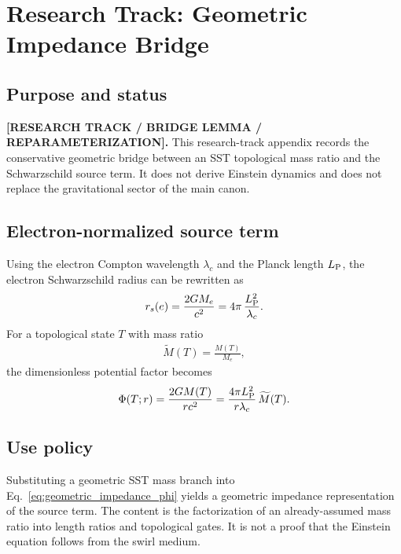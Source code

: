 
\section{Research Track: Geometric Impedance Bridge}
\label{sec:rt_geometric_impedance_bridge}

    \subsection{Purpose and status}
        \textbf{[RESEARCH TRACK / BRIDGE LEMMA / REPARAMETERIZATION].}
        This research-track appendix records the conservative geometric bridge
        between an SST topological mass ratio and the Schwarzschild source
        term.  It does not derive Einstein dynamics and does not replace the
        gravitational sector of the main canon.

    \subsection{Electron-normalized source term}
        Using the electron Compton wavelength $\lambda_c$ and the Planck length
        $L_{\rm P}$, the electron Schwarzschild radius can be rewritten as
        \begin{align}
            r_s(e)
            =
            \frac{2GM_e}{c^2}
            =
            4\pi\,\frac{L_{\rm P}^2}{\lambda_c}.
            \label{eq:electron_schwarzschild_geometric_bridge}
        \end{align}
        For a topological state $T$ with mass ratio
        \begin{align}
            \widetilde M(T)=\frac{M(T)}{M_e},
        \end{align}
        the dimensionless potential factor becomes
        \begin{align}
            \Phi(T;r)
            =
            \frac{2GM(T)}{rc^2}
            =
            \frac{4\pi L_{\rm P}^2}{r\lambda_c}\,
            \widetilde M(T).
            \label{eq:geometric_impedance_phi}
        \end{align}

    \subsection{Use policy}
        Substituting a geometric SST mass branch into
        Eq.~\eqref{eq:geometric_impedance_phi} yields a geometric impedance
        representation of the source term.  The content is the factorization
        of an already-assumed mass ratio into length ratios and topological
        gates.  It is not a proof that the Einstein equation follows from the
        swirl medium.


